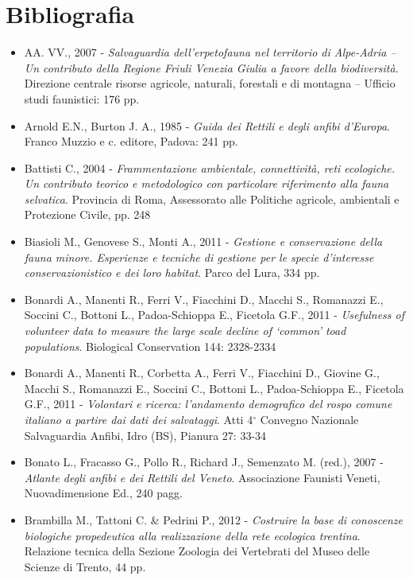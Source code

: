 \documentclass[11pt,a4paper,twoside]{memoir}
\begin{document}
\chapter{Bibliografia}
\pagestyle{empty}
\begin{itemize}\itemsep0pt
\item AA. VV., 2007 - \emph{Salvaguardia dell'erpetofauna nel territorio di Alpe-Adria – Un contributo della Regione Friuli Venezia Giulia a favore della biodiversità}. Direzione centrale risorse agricole, naturali, forestali e di montagna – Ufficio studi faunistici: 176 pp.
\item Arnold E.N., Burton J. A., 1985 - \emph{Guida dei Rettili e degli anfibi d’Europa}. Franco Muzzio e c. editore, Padova: 241 pp.
\item Battisti C., 2004 - \emph{Frammentazione ambientale, connettività, reti ecologiche. Un contributo teorico e metodologico con particolare riferimento alla fauna selvatica}. Provincia di Roma, Assessorato alle Politiche agricole, ambientali e Protezione Civile, pp. 248
\item Biasioli M., Genovese S., Monti A., 2011 - \emph{Gestione e conservazione della fauna minore. Esperienze e tecniche di gestione per le specie d'interesse conservazionistico e dei loro habitat}. Parco del Lura, 334 pp.
\item Bonardi A., Manenti R., Ferri V., Fiacchini D., Macchi S., Romanazzi E., Soccini C., Bottoni L., Padoa-Schioppa E., Ficetola G.F., 2011 - \emph{Usefulness of volunteer data to measure the large scale decline of ‘common’ toad populations}. Biological Conservation 144: 2328-2334
\item Bonardi A., Manenti R., Corbetta A., Ferri V., Fiacchini D., Giovine G., Macchi S., Romanazzi E., Soccini C., Bottoni L., Padoa-Schioppa E., Ficetola G.F., 2011 - \emph{Volontari e ricerca: l'andamento demografico del rospo comune italiano a partire dai dati dei salvataggi}. Atti 4$^\circ$ Convegno Nazionale Salvaguardia Anfibi, Idro (BS), Pianura 27: 33-34
\item Bonato L., Fracasso G., Pollo R., Richard J., Semenzato M. (red.), 2007 - \emph{Atlante degli anfibi e dei Rettili del Veneto}. Associazione Faunisti Veneti, Nuovadimensione Ed., 240 pagg.
\item Brambilla M., Tattoni C. \& Pedrini P., 2012 - \emph{Costruire la base di conoscenze biologiche propedeutica alla realizzazione della rete ecologica trentina}. Relazione tecnica della Sezione Zoologia dei Vertebrati del Museo delle Scienze di Trento, 44 pp.

\end{itemize}
\end{document}
